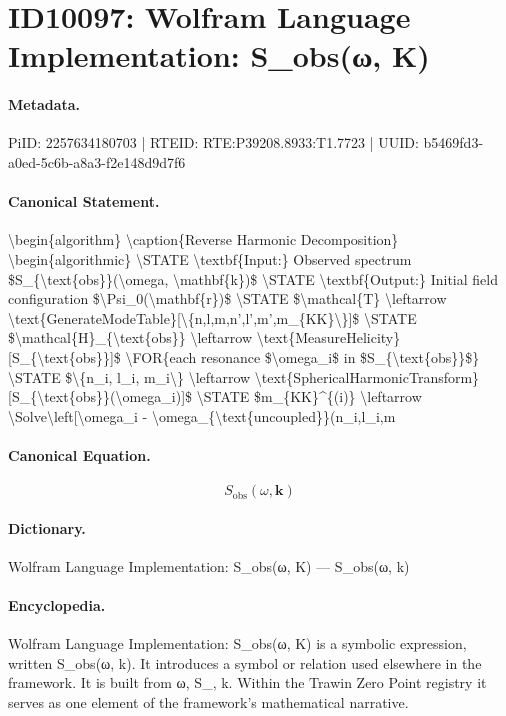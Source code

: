 \section*{ID10097: Wolfram Language Implementation: S\_obs(ω, K)}
\paragraph{Metadata.}
PiID: 2257634180703 | RTEID: RTE:P39208.8933:T1.7723 | UUID: b5469fd3-a0ed-5c6b-a8a3-f2e148d9d7f6

\paragraph{Canonical Statement.}
\textbackslash{}begin\{algorithm\} \textbackslash{}caption\{Reverse Harmonic Decomposition\} \textbackslash{}begin\{algorithmic\} \textbackslash{}STATE \textbackslash{}textbf\{Input:\} Observed spectrum \$S\_\{\textbackslash{}text\{obs\}\}(\textbackslash{}omega, \textbackslash{}mathbf\{k\})\$ \textbackslash{}STATE \textbackslash{}textbf\{Output:\} Initial field configuration \$\textbackslash{}Psi\_0(\textbackslash{}mathbf\{r\})\$ \textbackslash{}STATE \$\textbackslash{}mathcal\{T\} \textbackslash{}leftarrow \textbackslash{}text\{GenerateModeTable\}[\textbackslash{}\{n,l,m,n',l',m',m\_\{KK\}\textbackslash{}\}]\$ \textbackslash{}STATE \$\textbackslash{}mathcal\{H\}\_\{\textbackslash{}text\{obs\}\} \textbackslash{}leftarrow \textbackslash{}text\{MeasureHelicity\}[S\_\{\textbackslash{}text\{obs\}\}]\$ \textbackslash{}FOR\{each resonance \$\textbackslash{}omega\_i\$ in \$S\_\{\textbackslash{}text\{obs\}\}\$\} \textbackslash{}STATE \$\textbackslash{}\{n\_i, l\_i, m\_i\textbackslash{}\} \textbackslash{}leftarrow \textbackslash{}text\{SphericalHarmonicTransform\}[S\_\{\textbackslash{}text\{obs\}\}(\textbackslash{}omega\_i)]\$ \textbackslash{}STATE \$m\_\{KK\}\textasciicircum{}\{(i)\} \textbackslash{}leftarrow \textbackslash{}Solve\textbackslash{}left[\textbackslash{}omega\_i - \textbackslash{}omega\_\{\textbackslash{}text\{uncoupled\}\}(n\_i,l\_i,m

\paragraph{Canonical Equation.}
\[
S_{\text{obs}}(\omega, \mathbf{k})
\]

\paragraph{Dictionary.}
Wolfram Language Implementation: S\_obs(ω, K) — S\_obs(ω, k)

\paragraph{Encyclopedia.}
Wolfram Language Implementation: S\_obs(ω, K) is a symbolic expression, written S\_obs(ω, k). It introduces a symbol or relation used elsewhere in the framework. It is built from ω, S\_, k. Within the Trawin Zero Point registry it serves as one element of the framework's mathematical narrative.
